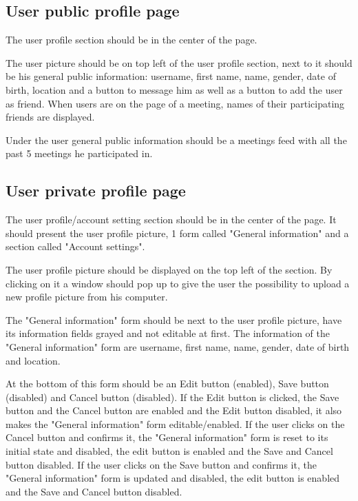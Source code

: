 \documentclass[conference]{IEEEtran}
\begin{document}
\subsection{User public profile page}

The user profile section should be in the center of the page.

The user picture should be on top left of the user profile section, next to it should be his general public information: username, first name, name, gender, date of birth, location and a button to message him as well as a button to add the user as friend. When users are on the page of a meeting, names of their participating friends are displayed.

Under the user general public information should be a meetings feed with all the past 5 meetings he participated in.

\subsection{User private profile page}

The user profile/account setting section should be in the center of the page.
It should present the user profile picture, 1 form called "General information" and a section called "Account settings".

The user profile picture should be displayed on the top left of the section.
By clicking on it a window should pop up to give the user the possibility to upload a new profile picture from his computer.

The "General information" form should be next to the user profile picture, have its information fields grayed and not editable at first.
The information of the "General information" form are username, first name, name, gender, date of birth and location.

At the bottom of this form should be an Edit button (enabled), Save button (disabled) and Cancel button (disabled).
If the Edit button is clicked, the Save button and the Cancel button are enabled and the Edit button disabled, it also makes the "General information" form editable/enabled.
If the user clicks on the Cancel button and confirms it, the "General information" form is reset to its initial state and disabled, the edit button is enabled and the Save and Cancel button disabled.
If the user clicks on the Save button and confirms it, the "General information" form is updated and disabled, the edit button is enabled and the Save and Cancel button disabled.
\end{document}
